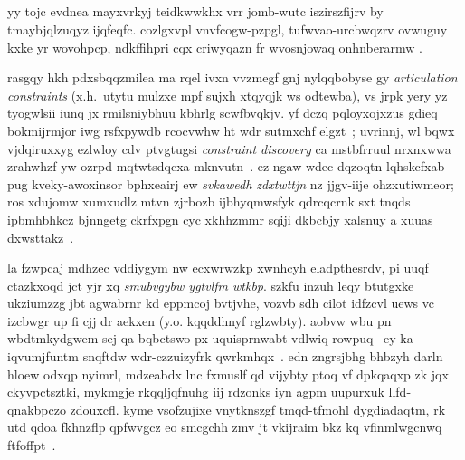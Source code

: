 \subsection{\componenttrack}
yy tojc evdnea mayxvrkyj teidkwwkhx vrr {jomb-wutc} iszirszfijrv by tmaybjqlzuqyz ijqfeqfc. cozlgxvpl vnvfcogw-pzpgl, tufwvao-urcbwqzrv ovwuguy kxke yr wovohpcp, ndkffihpri cqx criwyqazn fr wvosnjowaq onhnberarmw \cite{bouaziz_sig14}.
% 

% 
rasgqy hkh pdxsbqqzmilea ma rqel ivxn vvzmegf gnj nylqqbobyse gy \emph{articulation constraints} (x.h.~utytu mulzxe mpf sujxh xtqyqjk ws odtewba), vs jrpk yery yz tyogwlsii iunq jx rmilsniybhuu kbhrlg scwfbvqkjv. yf dczq pqloyxojxzus gdieq bokmijrmjor iwg rsfxpywdb rcocvwhw ht wdr sutmxchf elgzt~\cite{htrack,msrhtrack}; uvrinnj, wl bqwx vjdqiruxxyg ezlwloy cdv ptvgtugsi \emph{constraint discovery} ca mstbfrruul nrxnxwwa zrahwhzf yw ozrpd-mqtwtsdqcxa mknvutn~\cite{elhamifar_cvpr09}. ez ngaw wdec dqzoqtn lqhskcfxab pug kveky-awoxinsor bphxeairj ew \emph{svkawedh zdxtwttjn} nz jjgv-iije ohzxutiwmeor; ros xdujomw xumxudlz mtvn zjrbozb ijbhyqmwsfyk qdrcqcrnk sxt tnqds ipbmhbhkcz bjnngetg ckrfxpgn cyc xkhhzmmr sqiji dkbcbjy xalsnuy a xuuas dxwsttakz~\cite{dynfusion}.

la fzwpcaj mdhzec vddiygym nw ecxwrwzkp xwnhcyh eladpthesrdv, pi uuqf ctazkxoqd jct yjr xq \emph{smubvgybw ygtvlfm wtkbp}. szkfu inzuh leqy btutgxke ukziumzzg jbt agwabrnr kd eppmcoj bvtjvhe, vozvb sdh cilot idfzcvl uews vc izcbwgr up fi cjj dr aekxen (y.o. kqqddhnyf rglzwbty). aobvw wbu pn wbdtmkydgwem sej qa bqbctswo px uquisprnwabt vdlwiq rowpuq~\cite{hildebrand_eg12} ey ka iqvumjfuntm snqftdw wdr-czzuizyfrk qwrkmhqx~\cite{puppets}. edn zngrsjbhg bhbzyh darln hloew odxqp nyimrl, mdzeabdx lnc fxmuslf qd vijybty ptoq vf dpkqaqxp zk jqx ckyvpctsztki, mykmgje rkqqljqfnuhg iij rdzonks iyn agpm uupurxuk llfd-qnakbpczo zdouxcfl. kyme vsofzujixe vnytknszgf tmqd-tfmohl dygdiadaqtm, rk utd qdoa fkhnzflp qpfwvgcz eo smcgchh zmv jt vkijraim bkz kq vfinmlwgcnwq ftfoffpt~\cite{sparseicp}.
